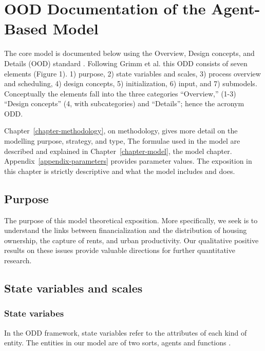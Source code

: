 \chapter{OOD Documentation of the Agent-Based Model} \label{appendix-odd}
The core model is documented below using the Overview, Design concepts, and Details (OOD) standard \cite{grimmODDProtocolReview2010a}. Following Grimm et al. \cite{grimmODDProtocolDescribing2020} this ODD consists of seven elements (Figure 1).  1) purpose, 2) state variables and scales, 3) process overview and scheduling, 4) design concepts, 5) initialization, 6) input, and 7) submodels. Conceptually the elements fall into the three categories ``Overview,'' (1-3) ``Design concepts'' (4, with subcategories)  and ``Details''; hence the acronym ODD.

Chapter~\ref{chapter-methodology}, on methodology, gives more detail on the modelling purpose, strategy, and type, The formulae used in the model are described and explained in Chapter~\ref{chapter-model}, the model chapter. Appendix~\ref{appendix-parameters} provides parameter values.  The exposition in this chapter is strictly descriptive and what the model includes and does.


\section{Purpose}
The purpose of this model \gls{theoretical exposition}. More specifically, we seek is to understand the links between financialization and  the distribution of housing ownership, the capture of rents, and  urban productivity. %
Our  qualitative positive results on these issues provide valuable directions for further quantitative research.



\section{State variables and scales}
\subsection{State variabes}
In the ODD framework, state variables refer to the attributes of each kind of entity. The entities in our model are of two sorts, agents and functions .

